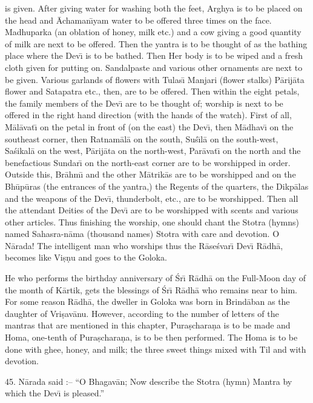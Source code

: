 is given. After giving water for washing both the feet, Arghya is to be placed on the head and \=Achaman\={\i}yam water to be offered three times on the face. Madhuparka (an oblation of honey, milk etc.) and a cow giving a good quantity of milk are next to be offered. Then the yantra is to be thought of as the bathing place where the Dev\={\i} is to be bathed. Then Her body is to be wiped and a fresh cloth given for putting on. Sandalpaste and various other ornaments are next to be given. Various garlands of flowers with Tulas\={\i} Manjari (flower stalks) P\=arij\=ata flower and Satapatra etc., then, are to be offered. Then within the eight petals, the family members of the Dev\={\i} are to be thought of; worship is next to be offered in the right hand direction (with the hands of the watch). First of all, M\=al\=avat\={\i} on the petal in front of (on the east) the Dev\={\i}, then M\=adhav\={\i} on the southeast corner, then Ratnam\=al\=a on the south, Su\'s\={\i}l\=a on the south-west, Sa\'sikal\=a on the west, P\=arij\=ata on the north-west, Par\=avat\={\i} on the north and the benefactious Sundar\={\i} on the north-east corner are to be worshipped in order. Outside this, Br\=ahm\={\i} and the other M\=atrik\=as are to be worshipped and on the Bh\=up\=uras (the entrances of the yantra,) the Regents of the quarters, the Dikp\=alas and the weapons of the Dev\={\i}, thunderbolt, etc., are to be worshipped. Then all the attendant Deities of the Dev\={\i} are to be worshipped with scents and various other articles. Thus finishing the worship, one should chant the Stotra (hymns) named Sahasra-n\=ama (thousand names) Stotra with care and devotion. O N\=arada! The intelligent man who worships thus the R\=ase\'svar\={\i} Dev\={\i} R\=adh\=a, becomes like Vi\d{s}\d{n}u and goes to the Goloka.

He who performs the birthday anniversary of \'Sr\={\i} R\=adh\=a on the Full-Moon day of the month of K\=artik, gets the blessings of \'Sr\={\i} R\=adh\=a who remains near to him. For some reason R\=adh\=a, the dweller in Goloka was born in Brind\=aban as the daughter of Vri\d{s}av\=anu. However, according to the number of letters of the mantras that are mentioned in this chapter, Pura\d{s}chara\d{n}a is to be made and Homa, one-tenth of Pura\d{s}chara\d{n}a, is to be then performed. The Homa is to be done with ghee, honey, and milk; the three sweet things mixed with Til and with devotion.

45. N\=arada said :-- ``O Bhagav\=an; Now describe the Stotra (hymn) Mantra by which the Dev\={\i} is pleased.''


